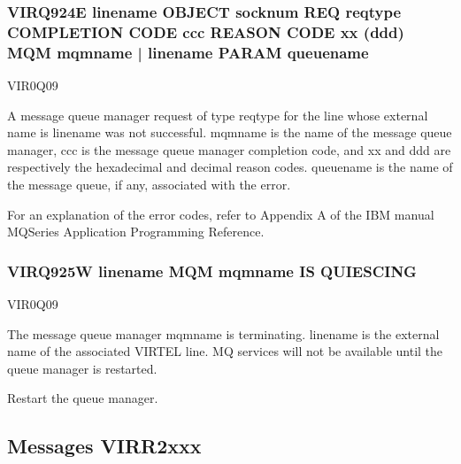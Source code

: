 \documentclass[letterpaper,10pt,english]{sphinxmanual}
\begin{document}
\subsubsection{VIRQ924E linename OBJECT socknum REQ reqtype COMPLETION CODE ccc REASON CODE xx (ddd) MQM mqmname | linename PARAM queuename}
\label{\detokenize{messages:virq924e-linename-object-socknum-req-reqtype-completion-code-ccc-reason-code-xx-ddd-mqm-mqmname-linename-param-queuename}}\begin{description}
\sphinxAtStartPar
VIR0Q09

\sphinxAtStartPar
A message queue manager request of type reqtype for the line whose external name is linename was not successful. mqmname is the name of the message queue manager, ccc is the message queue manager completion code, and xx and ddd are respectively the hexadecimal and decimal reason codes. queuename is the name of the message queue, if any, associated with the error.

\sphinxAtStartPar
For an explanation of the error codes, refer to Appendix A of the IBM manual MQSeries Application Programming Reference.

\end{description}


\subsubsection{VIRQ925W linename MQM mqmname IS QUIESCING}
\label{\detokenize{messages:virq925w-linename-mqm-mqmname-is-quiescing}}\begin{description}
\sphinxAtStartPar
VIR0Q09

\sphinxAtStartPar
The message queue manager mqmname is terminating. linename is the external name of the associated VIRTEL line. MQ services will not be available until the queue manager is restarted.

\sphinxAtStartPar
Restart the queue manager.

\end{description}


\subsection{Messages VIRR2xxx}
\label{\detokenize{messages:messages-virr2xxx}}
\end{document}
